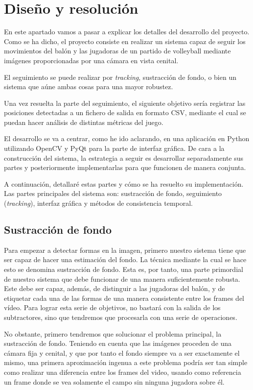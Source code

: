 \section{Diseño y resolución}

En este apartado vamos a pasar a explicar los detalles del desarrollo del proyecto. Como se ha dicho, el proyecto consiste en realizar un sistema capaz de seguir los movimientos del balón y las jugadoras de un partido de volleyball mediante imágenes proporcionadas por una cámara en vista cenital.

El seguimiento se puede realizar por \textit{tracking}, sustracción de fondo, o bien un sistema que aúne ambas cosas para una mayor robustez.

Una vez resuelta la parte del seguimiento, el siguiente objetivo sería registrar las posiciones detectadas a un fichero de salida en formato CSV, mediante el cual se puedan hacer análisis de distintas métricas del juego.

El desarrollo se va a centrar, como he ido aclarando, en una aplicación en Python utilizando OpenCV y PyQt para la parte de interfaz gráfica. De cara a la construcción del sistema, la estrategia a seguir es desarrollar separadamente sus partes y posteriormente implementarlas para que funcionen de manera conjunta.

A continuación, detallaré estas partes y cómo se ha resuelto su implementación. Las partes principales del sistema son: sustracción de fondo, seguimiento (\textit{tracking}), interfaz gráfica y métodos de consistencia temporal.

\subsection{Sustracción de fondo}
\label{sec:subtractors}
Para empezar a detectar formas en la imagen, primero nuestro sistema tiene que ser capaz de hacer una estimación del fondo. La técnica mediante la cual se hace esto se denomina sustracción de fondo. Esta es, por tanto, una parte primordial de nuestro sistema que debe funcionar de una manera suficientemente robusta. Este debe ser capaz, además, de distinguir a las jugadoras del balón, y de etiquetar cada una de las formas de una manera consistente entre los frames del vídeo. Para lograr esta serie de objetivos, no bastará con la salida de los subtractores, sino que tendremos que procesarla con una serie de operaciones.

No obstante, primero tendremos que solucionar el problema principal, la sustracción de fondo. Teniendo en cuenta que las imágenes proceden de una cámara fija y cenital, y que por tanto el fondo siempre va a ser exactamente el mismo, una primera aproximación ingenua a este problema podría ser tan simple como realizar una diferencia entre los frames del video, usando como referencia un frame donde se vea solamente el campo sin ninguna jugadora sobre él.

